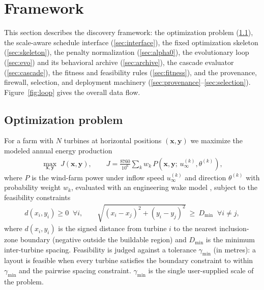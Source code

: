 \documentclass[11pt]{article}
\newcommand{\gm}{\gamma_{\min}}
\newcommand{\Dmin}{D_{\min}}
\begin{document}
\section{Framework}
\label{sec:framework}
This section describes the discovery framework: the optimization problem
(\ref{sec:problem}), the scale-aware schedule interface (\ref{sec:interface}), the
fixed optimization skeleton (\ref{sec:skeleton}), the penalty normalization
(\ref{sec:alpha0}), the evolutionary loop (\ref{sec:evo}) and its behavioral archive
(\ref{sec:archive}), the cascade evaluator (\ref{sec:cascade}), the fitness and
feasibility rules (\ref{sec:fitness}), and the provenance, firewall, selection, and
deployment machinery (\ref{sec:provenance}--\ref{sec:selection}). Figure~\ref{fig:loop}
gives the overall data flow.

\subsection{Optimization problem}
\label{sec:problem}
For a farm with $N$ turbines at horizontal positions $(\bm x,\bm y)$ we maximize the
modeled annual energy production
\begin{align}
\max_{\bm x,\bm y}\; J(\bm x,\bm y),\qquad
J = \frac{8760}{10^6}\sum_{k} w_k\, P\!\left(\bm x,\bm y;\,u^{(k)}_\infty,\theta^{(k)}\right),
\label{eq:aep}
\end{align}
where $P$ is the wind-farm power under inflow speed $u^{(k)}_\infty$ and direction
$\theta^{(k)}$ with probability weight $w_k$, evaluated with an engineering wake
model \citep{bastankhah2014wake}, subject to the feasibility constraints
\begin{align}
d(x_i,y_i) \ge 0 \;\;\forall i,\qquad
\sqrt{(x_i-x_j)^2+(y_i-y_j)^2}\ \ge\ \Dmin \;\;\forall i\neq j,
\label{eq:cons}
\end{align}
where $d(x_i,y_i)$ is the signed distance from turbine $i$ to the nearest inclusion-zone
boundary (negative outside the buildable region) and $\Dmin$ is the minimum
inter-turbine spacing. Feasibility is judged against a tolerance $\gm$ (in metres):
a layout is feasible when every turbine satisfies the boundary constraint to within
$\gm$ and the pairwise spacing constraint. $\gm$ is the single user-supplied scale of
the problem.
\end{document}
